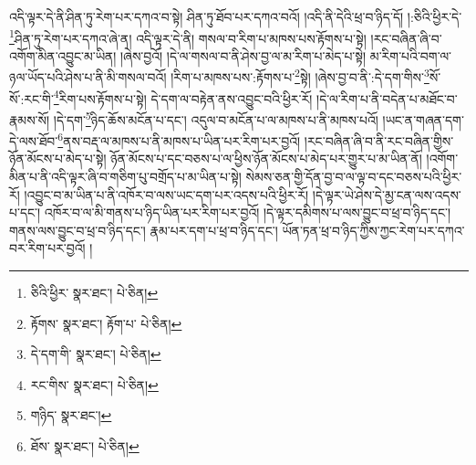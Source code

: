འདི་ལྟར་དེ་ནི་ཤིན་ཏུ་རེག་པར་དཀའ་བ་སྟེ། ཤིན་ཏུ་ཐོབ་པར་དཀའ་བའོ། །འདི་ནི་དེའི་ཕྲ་བ་ཉིད་དོ། །:ཅིའི་ཕྱིར་དེ་\footnote{ཅིའི་ཕྱིར་  སྣར་ཐང་།  པེ་ཅིན། }ཤིན་ཏུ་རེག་པར་དཀའ་ཞེ་ན། འདི་ལྟར་དེ་ནི། གསལ་བ་རིག་པ་མཁས་པས་རྟོགས་པ་སྟེ། །རང་བཞིན་ཞི་བ་འགོག་མིན་འབྱུང་མ་ཡིན། །ཞེས་བྱའོ། །དེ་ལ་གསལ་བ་ནི་ཤེས་བྱ་ལ་མ་རིག་པ་མེད་པ་སྟེ། མ་རིག་པའི་བག་ལ་ཉལ་ཡོད་པའི་ཤེས་པ་ནི་མི་གསལ་བའོ། །རིག་པ་མཁས་པས་:རྟོགས་པ་\footnote{རྟོགས་  སྣར་ཐང་། རྟོག་པ་  པེ་ཅིན། }སྟེ། །ཞེས་བྱ་བ་ནི་:དེ་དག་གིས་\footnote{དེ་དག་གི་  སྣར་ཐང་།  པེ་ཅིན། }སོ་སོ་:རང་གི་\footnote{རང་གིས་  སྣར་ཐང་།  པེ་ཅིན། }རིག་པས་རྟོགས་པ་སྟེ། དེ་དག་ལ་བརྟེན་ནས་འབྱུང་བའི་ཕྱིར་རོ། །དེ་ལ་རིག་པ་ནི་བདེན་པ་མཐོང་བ་རྣམས་སོ། །དེ་དག་\footnote{གཉིད་  སྣར་ཐང་། }ཉིད་ཆོས་མངོན་པ་དང་། འདུལ་བ་མངོན་པ་ལ་མཁས་པ་ནི་མཁས་པའོ། །ཡང་ན་གཞན་དག་དེ་ལས་ཐོབ་\footnote{ཐོས་  སྣར་ཐང་།  པེ་ཅིན། }ནས་བརྡ་ལ་མཁས་པ་ནི་མཁས་པ་ཡིན་པར་རིག་པར་བྱའོ། །རང་བཞིན་ཞི་བ་ནི་རང་བཞིན་གྱིས་ཉོན་མོངས་པ་མེད་པ་སྟེ། ཉོན་མོངས་པ་དང་བཅས་པ་ལ་ཕྱིས་ཉོན་མོངས་པ་མེད་པར་གྱུར་པ་མ་ཡིན་ནོ། །འགོག་མིན་པ་ནི་འདི་ལྟར་ཞི་བ་གཅིག་པུ་བགྲོད་པ་མ་ཡིན་པ་སྟེ། སེམས་ཅན་གྱི་དོན་བྱ་བ་ལ་ལྟ་བ་དང་བཅས་པའི་ཕྱིར་རོ། །འབྱུང་བ་མ་ཡིན་པ་ནི་འཁོར་བ་ལས་ཡང་དག་པར་འདས་པའི་ཕྱིར་རོ། །དེ་ལྟར་ཡེ་ཤེས་དེ་མྱ་ངན་ལས་འདས་པ་དང་། འཁོར་བ་ལ་མི་གནས་པ་ཉིད་ཡིན་པར་རིག་པར་བྱའོ། །དེ་ལྟར་དམིགས་པ་ལས་བྱུང་བ་ཕྲ་བ་ཉིད་དང་། གནས་ལས་བྱུང་བ་ཕྲ་བ་ཉིད་དང་། རྣམ་པར་དག་པ་ཕྲ་བ་ཉིད་དང་། ཡོན་ཏན་ཕྲ་བ་ཉིད་ཀྱིས་ཀྱང་རེག་པར་དཀའ་བར་རིག་པར་བྱའོ། །
